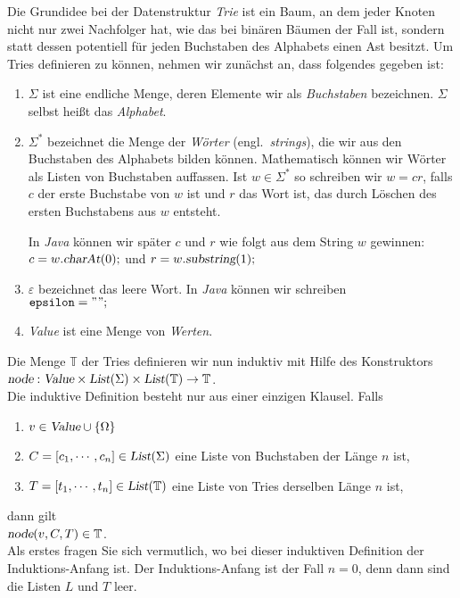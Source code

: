 Die Grundidee bei der Datenstruktur \emph{Trie} ist ein Baum, an dem jeder Knoten nicht
nur zwei Nachfolger hat, wie das bei bin\"aren B\"aumen der Fall ist, sondern statt dessen
potentiell f\"ur jeden Buchstaben des Alphabets einen Ast besitzt.  Um Tries definieren zu
k\"onnen, nehmen wir zun\"achst an, dass folgendes gegeben ist:
\begin{enumerate}
\item $\Sigma$ ist eine endliche Menge, deren Elemente wir als \emph{Buchstaben}
      bezeichnen. $\Sigma$ selbst hei{\ss}t das \emph{Alphabet}.
\item $\Sigma^*$ bezeichnet die Menge der \emph{W\"orter} (engl.~\emph{strings}), die wir aus den Buchstaben
      des Alphabets bilden k\"onnen.  Mathematisch k\"onnen wir W\"orter als Listen von 
      Buchstaben auffassen. Ist $w \in \Sigma^*$ so schreiben wir $w = cr$, falls
      $c$ der erste Buchstabe von $w$ ist und $r$ das Wort ist, das durch L\"oschen des
      ersten Buchstabens aus $w$ entsteht.  

      In \textsl{Java} k\"onnen wir sp\"ater $c$ und $r$ wie
      folgt aus dem String $w$ gewinnen: \\[0.2cm]
      \hspace*{1.3cm} $c = w.\textsl{charAt}(0)\mathtt{;}$ 
      \quad und \quad $r = w.\textsl{substring}(1)\mathtt{;}$
\item $\varepsilon$ bezeichnet das leere Wort.  In \textsl{Java} k\"onnen wir schreiben \\[0.2cm]
      \hspace*{1.3cm} $\mathtt{epsilon} = \symbol{34}\symbol{34}\mathtt{;}$ 
\item \textsl{Value} ist eine Menge von \emph{Werten}.  
\end{enumerate}
Die Menge $\mathbb{T}$ der Tries definieren wir nun induktiv mit Hilfe des 
Konstruktors \\[0.2cm]
\hspace*{1.3cm} 
$\textsl{node}: \textsl{Value} \times \textsl{List}(\Sigma) \times
\textsl{List}(\mathbb{T}) \rightarrow \mathbb{T}$. \\[0.2cm]
Die induktive Definition besteht nur aus einer einzigen Klausel. Falls
\begin{enumerate}
\item $v \in \textsl{Value} \cup \{\Omega\}$
\item $C = [c_1, \cdots, c_n] \in \textsl{List}(\Sigma)$ eine Liste von Buchstaben der
      L\"ange $n$ ist,
\item $T = [t_1, \cdots, t_n] \in \textsl{List}(\mathbb{T})$ eine Liste von Tries derselben L\"ange $n$ ist, 
\end{enumerate}
dann gilt \\[0.2cm]
\hspace*{1.3cm}  $\textsl{node}(v, C, T) \in \mathbb{T}$.  \\[0.2cm]
Als erstes fragen Sie sich
vermutlich, wo bei dieser induktiven Definition der Induktions-Anfang ist.
Der Induktions-Anfang ist der Fall $n=0$, denn dann sind die Listen $L$ und $T$ leer.

